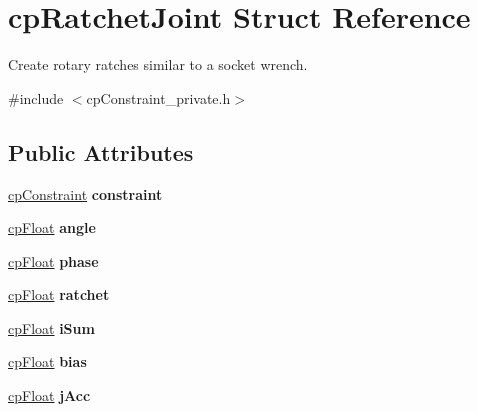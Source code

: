 \hypertarget{structcp_ratchet_joint}{}\section{cp\+Ratchet\+Joint Struct Reference}
\label{structcp_ratchet_joint}


Create rotary ratches similar to a socket wrench.  




{\ttfamily \#include $<$cp\+Constraint\+\_\+private.\+h$>$}

\subsection*{Public Attributes}
\begin{DoxyCompactItemize}
\item 
\hypertarget{structcp_ratchet_joint_af9d8bbe16647cdd22ac11cc62c159ec6}{}\hyperlink{structcp_constraint}{cp\+Constraint} {\bfseries constraint}\label{structcp_ratchet_joint_af9d8bbe16647cdd22ac11cc62c159ec6}

\item 
\hypertarget{structcp_ratchet_joint_ad59adcecd4f37a4f852e061fab6f6f73}{}\hyperlink{group__basic_types_gac1ed65573e035bf892505768c852d8d3}{cp\+Float} {\bfseries angle}\label{structcp_ratchet_joint_ad59adcecd4f37a4f852e061fab6f6f73}

\item 
\hypertarget{structcp_ratchet_joint_a331d7a3810f61fdb2c8460157c8f4ff1}{}\hyperlink{group__basic_types_gac1ed65573e035bf892505768c852d8d3}{cp\+Float} {\bfseries phase}\label{structcp_ratchet_joint_a331d7a3810f61fdb2c8460157c8f4ff1}

\item 
\hypertarget{structcp_ratchet_joint_a0eec70ed3e1e8ef260e8a008ab3fb5a6}{}\hyperlink{group__basic_types_gac1ed65573e035bf892505768c852d8d3}{cp\+Float} {\bfseries ratchet}\label{structcp_ratchet_joint_a0eec70ed3e1e8ef260e8a008ab3fb5a6}

\item 
\hypertarget{structcp_ratchet_joint_a11e3d08ea918cc5a9b7434d79b83e329}{}\hyperlink{group__basic_types_gac1ed65573e035bf892505768c852d8d3}{cp\+Float} {\bfseries i\+Sum}\label{structcp_ratchet_joint_a11e3d08ea918cc5a9b7434d79b83e329}

\item 
\hypertarget{structcp_ratchet_joint_a5560e06a4fa4e0ad50a9be0df9bf03d6}{}\hyperlink{group__basic_types_gac1ed65573e035bf892505768c852d8d3}{cp\+Float} {\bfseries bias}\label{structcp_ratchet_joint_a5560e06a4fa4e0ad50a9be0df9bf03d6}

\item 
\hypertarget{structcp_ratchet_joint_a26d63236a02cf6622ebc256db530b578}{}\hyperlink{group__basic_types_gac1ed65573e035bf892505768c852d8d3}{cp\+Float} {\bfseries j\+Acc}\label{structcp_ratchet_joint_a26d63236a02cf6622ebc256db530b578}

\end{DoxyCompactItemize}


